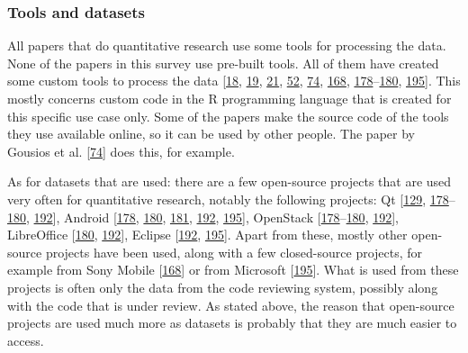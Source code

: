 \documentclass[]{book}
\begin{document}
\subsubsection{Tools and datasets}\label{tools-and-datasets}

All papers that do quantitative research use some tools for processing
the data. None of the papers in this survey use pre-built tools. All of
them have created some custom tools to process the data
{[}\protect\hyperlink{ref-baysal2016investigating}{18},
\protect\hyperlink{ref-baysal2013influence}{19},
\protect\hyperlink{ref-beller2014modern}{21},
\protect\hyperlink{ref-czerwonka2015code}{52},
\protect\hyperlink{ref-gousios2014exploratory}{74},
\protect\hyperlink{ref-shimagaki2016study}{168},
\protect\hyperlink{ref-thongtanunam2017review}{178}--\protect\hyperlink{ref-thongtanunam2015should}{180},
\protect\hyperlink{ref-zanjani2016automatically}{195}{]}. This mostly
concerns custom code in the R programming language that is created for
this specific use case only. Some of the papers make the source code of
the tools they use available online, so it can be used by other people.
The paper by Gousios et al.
{[}\protect\hyperlink{ref-gousios2014exploratory}{74}{]} does this, for
example.

As for datasets that are used: there are a few open-source projects that
are used very often for quantitative research, notably the following
projects: Qt {[}\protect\hyperlink{ref-mcintosh2014impact}{129},
\protect\hyperlink{ref-thongtanunam2017review}{178}--\protect\hyperlink{ref-thongtanunam2015should}{180},
\protect\hyperlink{ref-yang2016mining}{192}{]}, Android
{[}\protect\hyperlink{ref-thongtanunam2017review}{178},
\protect\hyperlink{ref-thongtanunam2015should}{180},
\protect\hyperlink{ref-thongtanunam2014reda}{181},
\protect\hyperlink{ref-yang2016mining}{192},
\protect\hyperlink{ref-zanjani2016automatically}{195}{]}, OpenStack
{[}\protect\hyperlink{ref-thongtanunam2017review}{178}--\protect\hyperlink{ref-thongtanunam2015should}{180},
\protect\hyperlink{ref-yang2016mining}{192}{]}, LibreOffice
{[}\protect\hyperlink{ref-thongtanunam2015should}{180},
\protect\hyperlink{ref-yang2016mining}{192}{]}, Eclipse
{[}\protect\hyperlink{ref-yang2016mining}{192},
\protect\hyperlink{ref-zanjani2016automatically}{195}{]}. Apart from
these, mostly other open-source projects have been used, along with a
few closed-source projects, for example from Sony Mobile
{[}\protect\hyperlink{ref-shimagaki2016study}{168}{]} or from Microsoft
{[}\protect\hyperlink{ref-zanjani2016automatically}{195}{]}. What is
used from these projects is often only the data from the code reviewing
system, possibly along with the code that is under review. As stated
above, the reason that open-source projects are used much more as
datasets is probably that they are much easier to access.
\end{document}
